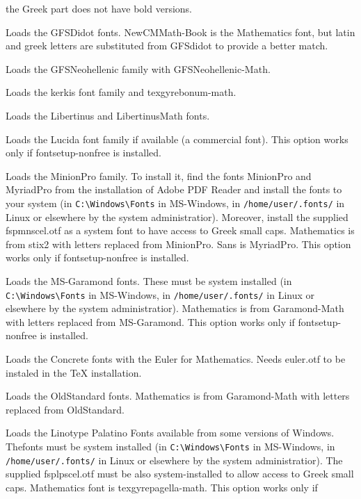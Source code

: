 \documentclass{book}
\begin{document}
\begin{description}
      the Greek part does not have bold versions.
    \item[gfsdidot] Loads the GFSDidot fonts. NewCMMath-Book is the Mathematics font, but latin
      and greek letters are substituted from GFSdidot to provide a better match.
    \item[gfsneohellenic] Loads the GFSNeohellenic family with GFSNeohellenic-Math.
    \item[kerkis] Loads the kerkis font family and texgyrebonum-math.
    \item[libertinus] Loads the Libertinus and LibertinusMath fonts.
    \item[lucida] Loads the Lucida font family if available (a commercial font). This option works only if
    fontsetup-nonfree is installed.
    \item[minion] Loads the MinionPro family. To install it, find the fonts MinionPro and
      MyriadPro from the installation of Adobe PDF Reader and install the fonts to your system
      (in \verb|C:\Windows\Fonts| in MS-Windows, in \verb|/home/user/.fonts/| in Linux
      or elsewhere by the system administratior). Moreover, install the supplied
      fspmnscel.otf as a system font to have access to Greek small caps.
      Mathematics is from stix2
      with letters replaced from MinionPro. Sans is MyriadPro. This option works only if
    fontsetup-nonfree is installed.
    \item[msgaramond] Loads the MS-Garamond fonts. These must be system installed
      (in \verb|C:\Windows\Fonts| in MS-Windows, in \verb|/home/user/.fonts/| in Linux
      or elsewhere by the system administratior). Mathematics is from
      Garamond-Math with letters replaced
      from MS-Garamond. This option works only if
    fontsetup-nonfree is installed.
    \item[neoeuler] Loads the Concrete fonts with the Euler for Mathematics. 
      Needs euler.otf to be instaled in the TeX installation.
\item[oldstandard] Loads the OldStandard fonts. Mathematics is from
      Garamond-Math with letters replaced
      from OldStandard.
    \item[palatino] Loads the Linotype Palatino Fonts available from some versions of Windows.
      Thefonts must be system installed (in \verb|C:\Windows\Fonts| in MS-Windows,
      in \verb|/home/user/.fonts/| in Linux or elsewhere by the system administratior). The supplied
      fsplpscel.otf must be also
      system-installed to allow access to Greek small caps.
      Mathematics font is texgyrepagella-math. This option works only if

\end{description}
\end{document}
